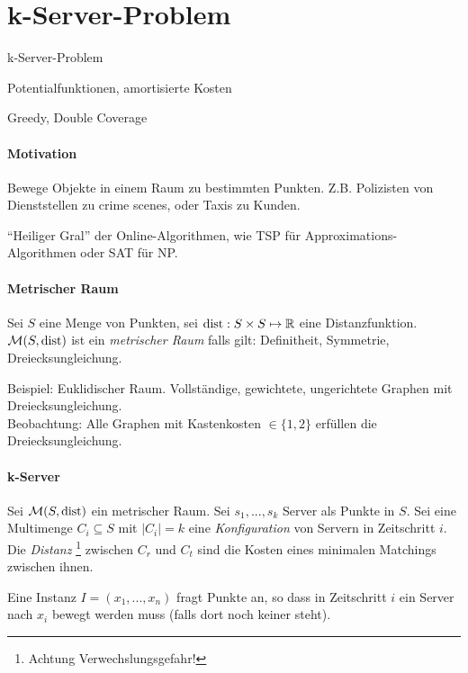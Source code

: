 \section{k-Server-Problem}

\begin{takeaway}
    \item k-Server-Problem
    \item Potentialfunktionen, amortisierte Kosten
    \item Greedy, Double Coverage
\end{takeaway}

\paragraph{Motivation}
Bewege Objekte in einem Raum zu bestimmten Punkten.
Z.B. Polizisten von Dienststellen zu crime scenes, oder Taxis zu Kunden.

``Heiliger Gral'' der Online-Algorithmen, wie TSP für Approximations-Algorithmen oder SAT für NP.

\paragraph{Metrischer Raum}
Sei $S$ eine Menge von Punkten, sei $\text{dist} : S \times S \mapsto \mathbb{R}$ eine Distanzfunktion.
$\mathcal{M}(S, \text{dist})$ ist ein \emph{metrischer Raum} falls gilt:
Definitheit, Symmetrie, Dreiecksungleichung.

Beispiel: Euklidischer Raum. Vollständige, gewichtete, ungerichtete Graphen mit Dreiecksungleichung.
\\
Beobachtung: Alle Graphen mit Kastenkosten $\in \{1, 2\}$ erfüllen die Dreiecksungleichung.

\paragraph{k-Server}
Sei $\mathcal{M}(S, \text{dist})$ ein metrischer Raum.
Sei $s_1, ..., s_k$ Server als Punkte in $S$.
Sei eine Multimenge $C_i \subseteq S$ mit $|C_i|=k$ eine \emph{Konfiguration} von Servern in Zeitschritt $i$.
\\
Die \emph{Distanz} \footnote{Achtung Verwechslungsgefahr!}
zwischen $C_r$ und $C_t$ sind die Kosten eines minimalen Matchings zwischen ihnen.

Eine Instanz $I = (x_1, ..., x_n)$ fragt Punkte an, so dass in Zeitschritt $i$ ein Server nach $x_i$
bewegt werden muss (falls dort noch keiner steht).

